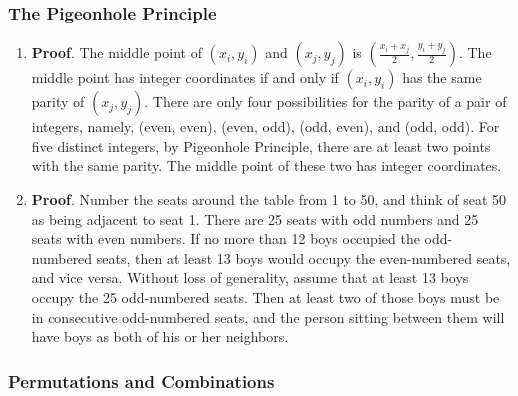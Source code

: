\documentclass{sig-alternate-05-2015}
\begin{document}
\subsubsection{The Pigeonhole Principle}
\begin{enumerate}
	\item \textbf{Proof}. The middle point of $(x_i, y_i)$ and $(x_j, y_j)$ is $(\frac{x_i + x_j}{2}, \frac{y_i + y_j}{2})$. The middle point has integer coordinates if and only if $(x_i, y_i)$ has the same parity of $(x_j, y_j)$.  There are only
	four possibilities for the parity of a pair of integers, namely, (even, even), (even, odd),
	(odd, even), and (odd, odd). For five distinct integers, by Pigeonhole Principle, there
	are at least two points with the same parity. The middle point of these two has integer
	coordinates.
	
	\item \textbf{Proof}. Number the seats around the table
	from 1 to 50, and think of seat 50 as being adjacent to seat 1.
	There are 25 seats with odd numbers and 25 seats with even
	numbers. If no more than 12 boys occupied the odd-numbered seats, then at least 13 boys would occupy the even-numbered
	seats, and vice versa. Without loss of generality, assume that
	at least 13 boys occupy the 25 odd-numbered seats. Then at
	least two of those boys must be in consecutive odd-numbered
	seats, and the person sitting between them will have boys as
	both of his or her neighbors.
\end{enumerate}
\subsubsection{Permutations and Combinations}
\end{document}
